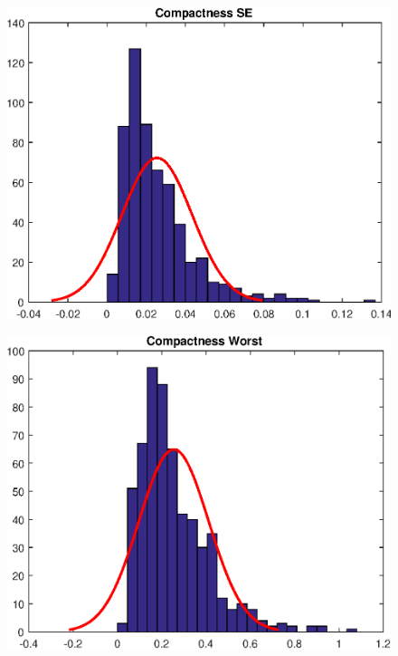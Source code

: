\documentclass[11pt,a4paper]{article}
\numberwithin{equation}{section}
\begin{document}
\begin{itemize}
\begin{figure}[H]
\centering
\begin{minipage}{.4\textwidth}
  \centering
  \includegraphics[width=\linewidth]{./img/compactness_se}
  \label{fig:test1}
\end{minipage}%
\begin{minipage}{.4\textwidth}
  \centering
  \includegraphics[width=\linewidth]{./img/compactness_worst}
  \label{fig:test2}
\end{minipage}
\end{figure}


\end{itemize}
\end{document}
